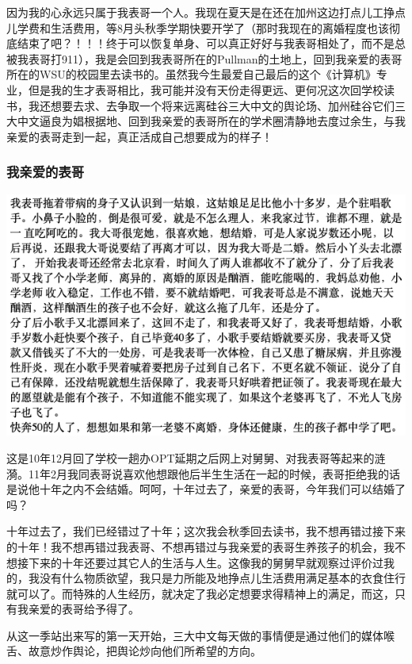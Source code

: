 \documentclass[9pt, b5paper]{article}
\begin{document}
因为我的心永远只属于我表哥一个人。我现在夏天是在还在加州这边打点儿工挣点儿学费和生活费用，等8月头秋季学期快要开学了（那时我现在的离婚程度也该彻底结束了吧？！！！终于可以恢复单身、可以真正好好与我表哥相处了，而不是总被我表哥打911），我是会回到我表哥所在的Pullman的土地上，回到我亲爱的表哥所在的WSU的校园里去读书的。虽然我今生最爱自己最后的这个《计算机》专业，但是我的生才表哥相比，我可能并没有天份走得更远、更何况这次回学校读书，我还想要去求、去争取一个将来远离硅谷三大中文的舆论场、加州硅谷它们三大中文逼良为娼根据地、回到我亲爱的表哥所在的学术圈清静地去度过余生，与我亲爱的表哥走到一起，真正活成自己想要成为的样子！

\subsubsection{我亲爱的表哥}
\label{sec:org164311e}

\begin{center}
\includegraphics[width=.9\linewidth]{./pic/readme_20210528_231147.png}
\end{center}

这是10年12月回了学校一趟办OPT延期之后网上对舅舅、对我表哥等起来的涟漪。11年2月我同表哥说喜欢他想跟他后半生生活在一起的时候，表哥拒绝我的话是说他十年之内不会结婚。呵呵，十年过去了，亲爱的表哥，今年我们可以结婚了吗？

十年过去了，我们已经错过了十年；这次我会秋季回去读书，我不想再错过接下来的十年！我不想再错过我表哥、不想再错过与我亲爱的表哥生养孩子的机会，我不想接下来的十年还要过其它人的生活与人生。这像我的舅舅早就观察过评价过我的，我没有什么物质欲望，我只是力所能及地挣点儿生活费用满足基本的衣食住行就可以了。而特殊的人生经历，就决定了我必定想要求得精神上的满足，而这，只有我亲爱的表哥给予得了。 

从这一季站出来写的第一天开始，三大中文每天做的事情便是通过他们的媒体喉舌、故意炒作舆论，把舆论炒向他们所希望的方向。
\end{document}
